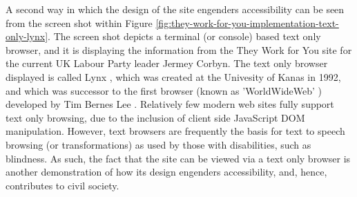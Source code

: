 A second way in which the design of the site engenders accessibility can be seen from the screen shot within Figure \ref{fig:they-work-for-you-implementation-text-only-lynx}.
The screen shot depicts a terminal (or console) based text only browser, and it is displaying the information from the They Work for You site for the current UK Labour Party leader Jermey Corbyn.
The text only browser displayed is called Lynx \cite{lynx}, which was created at the Univesity of Kanas in 1992, and which was successor to the first browser (known as 'WorldWideWeb' \cite{browser-history}) developed by Tim Bernes Lee \cite{tim-berners-lee}.
Relatively few modern web sites fully support text only browsing, due to the inclusion of client side JavaScript DOM manipulation.
However, text browsers are frequently the basis for text to speech browsing (or transformations) as used by those with disabilities, such as blindness.
As such, the fact that the site can be viewed via a text only browser is another demonstration of how its design engenders accessibility, and, hence, contributes to civil society.
